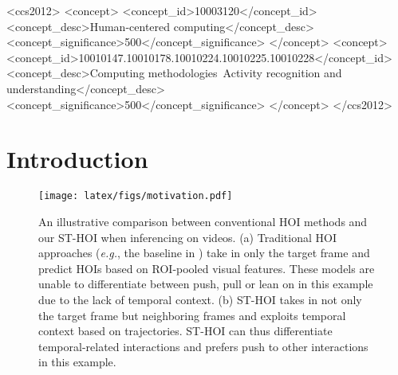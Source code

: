 \documentclass[sigconf]{acmart}
\begin{document}
\begin{CCSXML}
<ccs2012>
   <concept>
       <concept_id>10003120</concept_id>
       <concept_desc>Human-centered computing</concept_desc>
       <concept_significance>500</concept_significance>
       </concept>
   <concept>
       <concept_id>10010147.10010178.10010224.10010225.10010228</concept_id>
       <concept_desc>Computing methodologies~Activity recognition and understanding</concept_desc>
       <concept_significance>500</concept_significance>
       </concept>
</ccs2012>
\end{CCSXML}





\maketitle

\section{Introduction}
\label{sec:introduction}

\begin{figure}[t!]
\centering
\texttt{[image: latex/figs/motivation.pdf]}
\vspace{-1.2em}
\caption{An illustrative comparison between conventional HOI methods and our ST-HOI when inferencing on videos. 
(a) Traditional HOI approaches (\emph{e.g.}, the baseline in \cite{wan2019pose}) take in only the target frame and predict HOIs based on ROI-pooled visual features.
These models are unable to differentiate between {\selectfont push},  {\selectfont pull} or {\selectfont lean on} in this example due to the lack of temporal context.
(b) ST-HOI takes in not only the target frame but neighboring frames and exploits temporal context based on trajectories. 
ST-HOI can thus differentiate temporal-related interactions and prefers {\selectfont push} to other interactions in this example.
}
\vspace{-1.3em}
\label{fig:motivation}
\end{figure}
\end{document}

